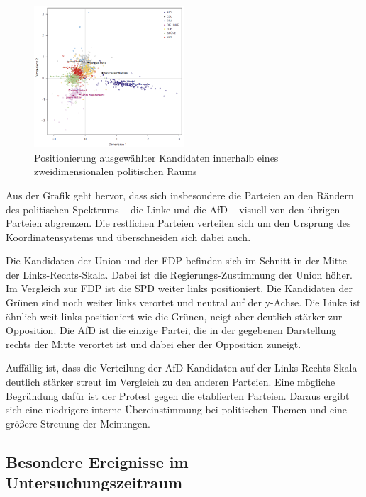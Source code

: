 \begin{figure}[H]
  \centering
  \includegraphics[width=0.5\textwidth]{data/images/positionierung_ausgewaehlter_kandidaten.png}
  \caption[Positionierung ausgewählter Kandidaten \autocite{saltzer_bundestagswahl_2022}]{Positionierung ausgewählter Kandidaten innerhalb eines zweidimensionalen politischen Raums \autocite{saltzer_bundestagswahl_2022}} \label{fig:positionierungAusgewaehlterKanidaten}
\end{figure}

Aus der Grafik geht hervor, dass sich insbesondere die Parteien an den Rändern des politischen Spektrums -- die Linke und die \ac{AfD} -- visuell von den übrigen Parteien abgrenzen. Die restlichen Parteien verteilen sich um den Ursprung des Koordinatensystems und überschneiden sich dabei auch.

Die Kandidaten der Union und der \ac{FDP} befinden sich im Schnitt in der Mitte der Links-Rechts-Skala. Dabei ist die Regierungs-Zustimmung der Union höher. Im Vergleich zur \ac{FDP} ist die \ac{SPD} weiter links positioniert. Die Kandidaten der Grünen sind noch weiter links verortet und neutral auf der y-Achse. Die Linke ist ähnlich weit links positioniert wie die Grünen, neigt aber deutlich stärker zur Opposition. Die \ac{AfD} ist die einzige Partei, die in der gegebenen Darstellung rechts der Mitte verortet ist und dabei eher der Opposition zuneigt.

Auffällig ist, dass die Verteilung der \ac{AfD}-Kandidaten auf der Links-Rechts-Skala deutlich stärker streut im Vergleich zu den anderen Parteien. Eine mögliche Begründung dafür ist der Protest gegen die etablierten Parteien. Daraus ergibt sich eine niedrigere interne Übereinstimmung bei politischen Themen und eine größere Streuung der Meinungen.

\subsection{Besondere Ereignisse im Untersuchungszeitraum} \label{subsec:besondereEreignisse}

